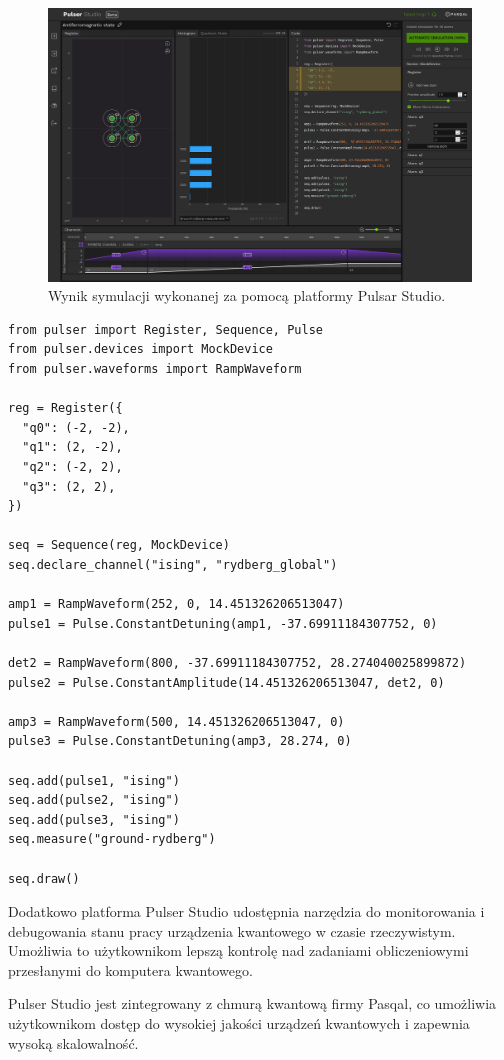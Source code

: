 \documentclass[a4paper,12pt
]{article}
\begin{document}
\begin{figure}
\centering
\includegraphics{Pulser-Studio-simulation-results-001.png}
\caption{Wynik symulacji wykonanej za pomocą platformy Pulsar Studio. }
\end{figure}

\begin{lstlisting}
from pulser import Register, Sequence, Pulse
from pulser.devices import MockDevice
from pulser.waveforms import RampWaveform

reg = Register({
  "q0": (-2, -2),
  "q1": (2, -2),
  "q2": (-2, 2),
  "q3": (2, 2),
})

seq = Sequence(reg, MockDevice)
seq.declare_channel("ising", "rydberg_global")

amp1 = RampWaveform(252, 0, 14.451326206513047)
pulse1 = Pulse.ConstantDetuning(amp1, -37.69911184307752, 0)

det2 = RampWaveform(800, -37.69911184307752, 28.274040025899872)
pulse2 = Pulse.ConstantAmplitude(14.451326206513047, det2, 0)

amp3 = RampWaveform(500, 14.451326206513047, 0)
pulse3 = Pulse.ConstantDetuning(amp3, 28.274, 0)

seq.add(pulse1, "ising")
seq.add(pulse2, "ising")
seq.add(pulse3, "ising")
seq.measure("ground-rydberg")

seq.draw()
\end{lstlisting}


Dodatkowo platforma Pulser Studio udostępnia narzędzia do monitorowania
i debugowania stanu pracy urządzenia kwantowego w czasie rzeczywistym.
Umożliwia to użytkownikom lepszą kontrolę nad zadaniami obliczeniowymi
przesłanymi do komputera kwantowego.

Pulser Studio jest zintegrowany z chmurą kwantową firmy Pasqal, co
umożliwia użytkownikom dostęp do wysokiej jakości urządzeń kwantowych i
zapewnia wysoką skalowalność.
\end{document}
